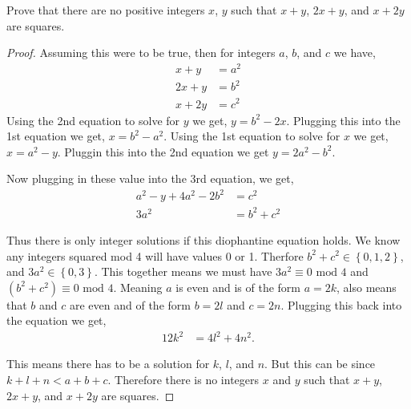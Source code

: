\documentclass[11pt]{article}
\newenvironment{problem}[2][Problem\!]{\begin{trivlist}
\item[\hskip \labelsep {\bfseries #1}\hskip \labelsep {\bfseries #2}]}{\end{trivlist}}
\newcommand{\set}[1]{\left\{#1\right\}} %
\begin{document}
\begin{tcolorbox}
    \begin{problem} {OC | 11/10 | 86.}
        Prove that there are no positive integers $x$, $y$ such that $x+y$, $2x + y$, and $x + 2y$ are squares. 
    \end{problem}
\end{tcolorbox}
\begin{proof}
    Assuming this were to be true, then for integers $a$, $b$, and $c$ we have,
    \begin{align*}
        x+y &= a^{2} \\
        2x+y &= b^{2} \\
        x + 2y &= c^{2}
    \end{align*}
    Using the 2nd equation to solve for $y$ we get, $y = b^{2} -2x$. Plugging this into the 1st equation we get, $x = b^{2} - a^{2}$. Using the 1st equation to solve for $x$ we get, $x = a^{2} -y$. Pluggin this into the 2nd equation we get $y = 2a^{2} -b^{2}$.

    Now plugging in these value into the 3rd equation, we get,
    \begin{align*}
        a^{2}-y + 4a^{2} -2b^{2} &= c^{2} \\
        3a^{2} &= b^{2} + c^{2}
    \end{align*}

    Thus there is only integer solutions if this diophantine equation holds. We know any integers squared mod 4 will have values 0 or 1. Therfore $b^{2} + c^{2} \in \set{0,1,2}$, and $3a^{2}\in \set{0,3}$. This together means we must have $3a^{2} \equiv 0 \text{ mod } 4$ and $(b^{2} + c^{2}) \equiv 0 \text{ mod }4$. Meaning $a$ is even and is of the form $a = 2k$, also means that $b$ and $c$ are even and of the form $b = 2l$ and $c = 2n$. Plugging this back into the equation we get,
    \begin{align*}
        12k^{2} & = 4l^{2} + 4n^{2}.
    \end{align*}

    This means there has to be a solution for $k$, $l$, and $n$. But this can be since $k + l + n < a + b + c$. Therefore there is no integers $x$ and $y$ such that $x +y$, $2x +y$, and $x + 2y$ are squares.
\end{proof}
\end{document}
